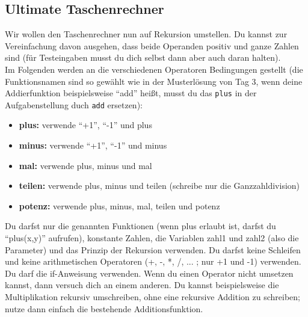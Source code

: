 \subsection{Ultimate Taschenrechner }
Wir wollen den Taschenrechner nun auf Rekursion umstellen. Du kannst zur Vereinfachung
davon ausgehen, dass beide Operanden positiv und ganze Zahlen sind (für Testeingaben
musst du dich selbst dann aber auch daran halten).
\\Im Folgenden werden an die verschiedenen Operatoren Bedingungen gestellt (die
Funktionsnamen sind so gewählt wie in der Musterlösung von Tag 3, wenn deine
Addierfunktion beispielsweise "`add"' heißt, musst du das \texttt{plus} in der Aufgabenstellung duch \texttt{add} ersetzen):
\begin{itemize}
	\item \textbf{\textcolor[rgb]{0,0.5,1}{plus:}} verwende "`+1"', "`-1"' und plus
	\item \textbf{\textcolor[rgb]{0,0.5,1}{minus:}} verwende "`+1"', "`-1"' und minus
	\item \textbf{\textcolor[rgb]{0,0.5,1}{mal:}} verwende plus, minus und mal
	\item \textbf{\textcolor[rgb]{0,0.5,1}{teilen:}} verwende plus, minus und teilen (schreibe nur die Ganzzahldivision)
	\item \textbf{\textcolor[rgb]{0,0.5,1}{potenz:}} verwende plus, minus, mal, teilen und potenz
\end{itemize}
Du darfst nur die genannten Funktionen (wenn plus erlaubt ist, darfst du "`plus(x,y)"' aufrufen),
konstante Zahlen, die Variablen zahl1 und zahl2 (also die Parameter) und das Prinzip
der Rekursion verwenden. Du darfst keine Schleifen und keine arithmetischen Operatoren
(+, -, *, /, ... ; nur +1 und -1) verwenden. Du darf die if-Anweisung verwenden.
Wenn du einen Operator nicht umsetzen kannst, dann versuch dich an einem anderen.
Du kannst beispielsweise die Multiplikation rekursiv umschreiben, ohne eine rekursive
Addition zu schreiben; nutze dann einfach die bestehende Additionsfunktion.
